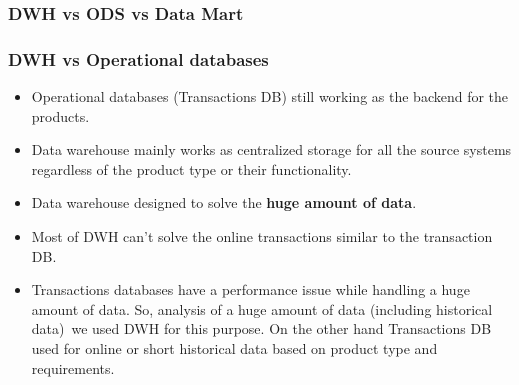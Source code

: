 

\begin{frame}
\frametitle{DWH vs ODS vs Data Mart}


\begin{table}[t]
	\centering	
\end{table}
\end{frame}



\begin{frame}
\frametitle{DWH vs Operational databases}

\begin{itemize}[<+->]
		\item Operational databases (Transactions DB) still working as the backend for the products.
		\item Data warehouse mainly works as centralized storage for all the source systems regardless of the product type or their functionality.
		\item Data warehouse designed to solve the \textbf{huge amount of data}.
		\item Most of DWH can't solve the online transactions similar to the transaction DB.
		\item Transactions databases have a performance issue while handling a huge amount of data. So, analysis of a huge amount of data (including historical data) we used DWH for this purpose. On the other hand Transactions DB used for online or short historical data based on product type and requirements.
\end{itemize}
\end{frame}


